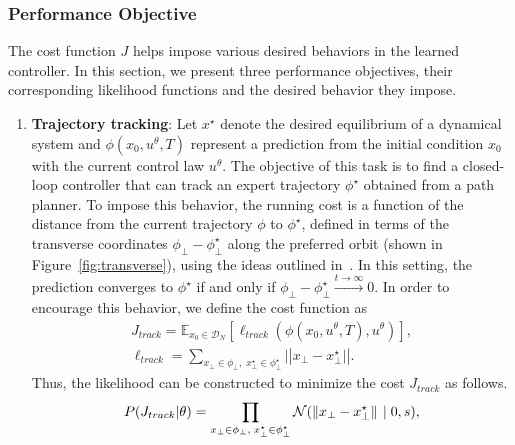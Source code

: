 \subsubsection{Performance Objective}
\label{sssec:cost}

The cost function $J$ helps impose various desired behaviors in the learned
controller. In this section, we present three performance objectives, their
corresponding likelihood functions and the desired behavior they impose.

\begin{enumerate}
    \item \textbf{Trajectory tracking}: Let $x^\star$ denote the desired equilibrium of a
    dynamical system and $\phi(x_0, u^\theta, T)$ represent a
    prediction from the initial condition $x_0$ with the current control law
    $u^\theta$. The objective of this task is to find a closed-loop controller
    that can track an expert trajectory $\phi^\star$ obtained from a path
    planner. To impose this behavior, the running cost is a function of the
    distance from the current trajectory $\phi$ to $\phi^\star$, defined in
    terms of the transverse coordinates $\phi_\bot-\phi^\star_\bot$ along
    the preferred orbit (shown in Figure~\ref{fig:transverse}), using the ideas outlined
    in~\cite{shiriaev2009transverse,manchester2010transverse}. In this setting,
    the prediction converges to $\phi^\star$ if and only if
    $\phi_\bot-\phi^\star_\bot \xrightarrow{t \to \infty}{} 0$. In order to
    encourage this behavior, we define the cost function as
    \begin{equation}
        \begin{gathered}
            J_{track} = \mathbb{E}_{x_0 \in \mathcal{D}_N}[ \ell_{track}( \phi(x_0, u^\theta, T), u^\theta) ], \\
            \ell_{track} =  \sum_{x_\bot \in \phi_\bot, \; x^\star_\bot \in \phi^\star_\bot} |\left| x_\bot-x^\star_\bot | \right |.
        \end{gathered}
        \label{eq:xperploss}   
    \end{equation}
    Thus, the likelihood can be constructed to minimize the cost $J_{track}$ as follows.
    \begin{align}
        P(J_{track} | \theta) = \prod_{x_\bot \in \phi_\bot, \; x^\star_\bot \in \phi^\star_\bot}\mathcal{N}(\norm{x_\bot - x^\star_\bot}{} \; | \; 0 , s),

\end{align}
\end{enumerate}
